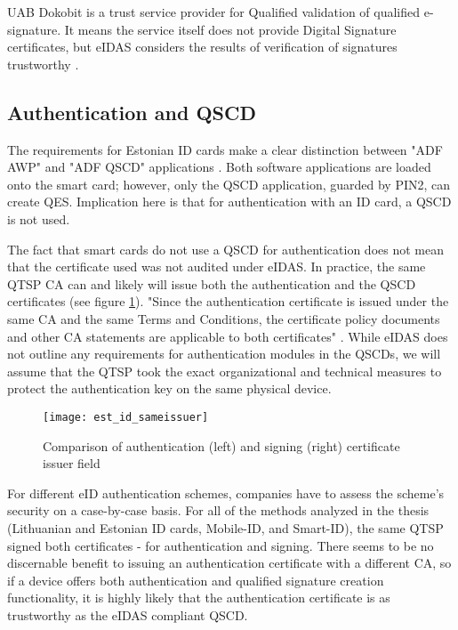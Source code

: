 UAB Dokobit is a trust service provider for Qualified validation of qualified e-signature. It means the service itself does not provide Digital Signature certificates, but eIDAS considers the results of verification of signatures trustworthy \cite{eu-trustservices}.

\subsection{Authentication and QSCD}

The requirements for Estonian ID cards make a clear distinction between "ADF AWP" and "ADF QSCD" applications \cite{}. Both software applications are loaded onto the smart card; however, only the QSCD application, guarded by PIN2, can create QES. Implication here is that for authentication with an ID card, a QSCD is not used.

The fact that smart cards do not use a QSCD for authentication does not mean that the certificate used was not audited under eIDAS. In practice, the same QTSP CA can and likely will issue both the authentication and the QSCD certificates (see figure \ref{fig:est-id-sameissuer}). "Since the authentication certificate is issued under the same CA and the same Terms and Conditions, the certificate policy documents and other CA statements are applicable to both certificates" \cite{arnis-phd}. While eIDAS does not outline any requirements for authentication modules in the QSCDs, we will assume that the QTSP took the exact organizational and technical measures to protect the authentication key on the same physical device.

\begin{figure}
    \centering
    \texttt{[image: est\_id\_sameissuer]}
    \caption{Comparison of authentication (left) and signing (right) certificate issuer field}
    \label{fig:est-id-sameissuer}
\end{figure}

For different eID authentication schemes, companies have to assess the scheme's security on a case-by-case basis. For all of the methods analyzed in the thesis (Lithuanian and Estonian ID cards, Mobile-ID, and Smart-ID), the same QTSP signed both certificates - for authentication and signing. There seems to be no discernable benefit to issuing an authentication certificate with a different CA, so if a device offers both authentication and qualified signature creation functionality, it is highly likely that the authentication certificate is as trustworthy as the eIDAS compliant QSCD.

